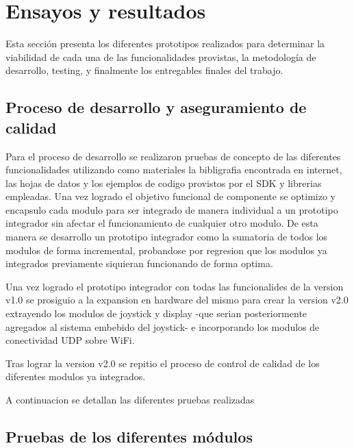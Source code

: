 
\chapter{Ensayos y resultados} %

\label{Chapter4} %

Esta sección presenta los diferentes prototipos realizados para determinar la viabilidad de cada una de las funcionalidades provistas, la metodología de desarrollo, testing, y finalmente los entregables finales del trabajo.

\section{Proceso de desarrollo y aseguramiento de calidad}
\label{sec:pruebasHW}

Para el proceso de desarrollo se realizaron pruebas de concepto de las diferentes funcionalidades utilizando como materiales la bibligrafia encontrada en internet, las hojas de datos y los ejemplos de codigo provistos por el SDK y librerias empleadas. Una vez logrado el objetivo funcional de componente se optimizo y encapsulo cada modulo para ser integrado de manera individual a un prototipo integrador sin afectar el funcionamiento de cualquier otro modulo.
De esta manera se desarrollo un prototipo integrador como la sumatoria de todos los modulos de forma incremental, probandose por regresion que los modulos ya integrados previamente siquieran funcionando de forma optima.

Una vez logrado el prototipo integrador con todas las funcionalides de la version v1.0 se prosiguio a la expansion en hardware del mismo para crear la version v2.0 extrayendo los modulos de joystick y display -que serian posteriormente agregados al sistema embebido del joystick- e incorporando los modulos de conectividad UDP sobre WiFi.

Tras lograr la version v2.0 se repitio el proceso de control de calidad de los diferentes modulos ya integrados.

A continuacion se detallan las diferentes pruebas realizadas 

\section{Pruebas de los diferentes módulos}
\label{sec:pruebasHW}

